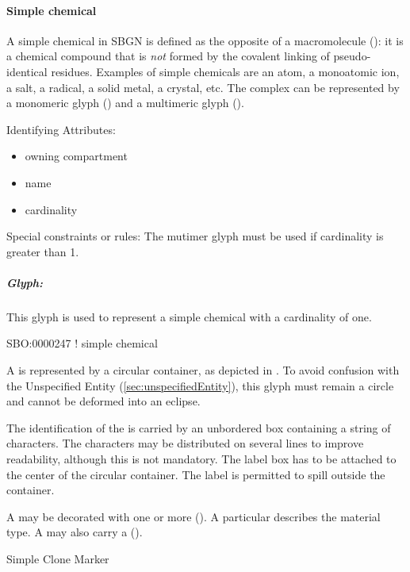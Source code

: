 
\paragraph{Simple chemical}
\label{sec:simpleChemical}

A simple chemical in SBGN is defined as the opposite of a
macromolecule (): it is a chemical compound that
is \emph{not} formed by the covalent linking of pseudo-identical
residues.  Examples of simple chemicals are an atom, a monoatomic ion,
a salt, a radical, a solid metal, a crystal, etc. The complex can be
represented by a monomeric glyph () and a multimeric
glyph ().


\begin{glyphDescription}
\item[Identifying Attributes:]\mbox{}
  \begin{itemize}
  \item owning compartment
  \item name
  \item cardinality
  \end{itemize}
\item[Special constraints or rules:]\mbox{}\newline The mutimer glyph
  must be used if cardinality is greater than 1.
\end{glyphDescription}


\subparagraph{Glyph: }

This glyph is used to represent a simple chemical with a cardinality
of one.

\begin{glyphDescription}

\glyphSboTerm SBO:0000247 ! simple chemical

\glyphContainer A  is represented by a circular
container, as depicted in . To avoid confusion
with the Unspecified Entity (\ref{sec:unspecifiedEntity}), this glyph
must remain a circle and cannot be deformed into an eclipse.

\glyphLabel The identification of the  is carried by an unbordered box containing a string of characters.  The characters may be distributed on several lines to improve readability, although this is not mandatory.  The label box has to be attached to the center of the circular container.  The label is permitted to spill outside the container.

\glyphAux A  may be decorated with one or more  ().  A particular  describes the material type.  A  may also carry a  ().

\glyphCloning Simple Clone Marker

\end{glyphDescription}

